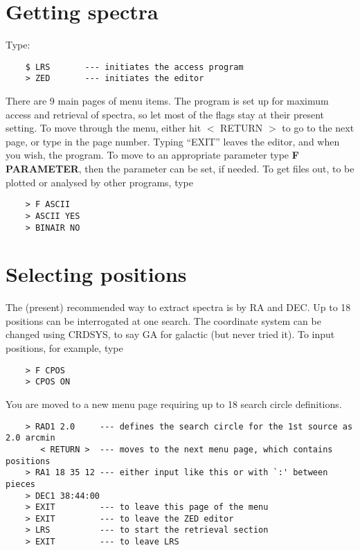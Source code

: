 \section{Getting spectra}

Type:
\begin{verbatim}
    $ LRS       --- initiates the access program
    > ZED       --- initiates the editor
\end{verbatim}
There are 9 main pages of menu items.
The program is set up for maximum access and retrieval of spectra, so let
most of the flags stay at their present setting.
To move through the menu, either hit $<$ RETURN $>$ to go to the next page,
or type in the page number.
Typing ``EXIT'' leaves the editor, and when you wish, the program.
To move to an appropriate parameter type {\bf F PARAMETER}, then the parameter
can be set, if needed.
To get files out, to be plotted or analysed by other programs, type
\begin{verbatim}
    > F ASCII
    > ASCII YES
    > BINAIR NO
\end{verbatim}

\section{Selecting positions}
The (present) recommended way to extract spectra is by RA and DEC.
Up to 18 positions can be interrogated at one search.
The coordinate system can be changed using CRDSYS, to say GA for galactic
(but never tried it).
To input positions, for example, type
\begin{verbatim}
    > F CPOS
    > CPOS ON
\end{verbatim}
You are moved to a new menu page requiring up to 18 search circle definitions. 

\begin{verbatim}
    > RAD1 2.0     --- defines the search circle for the 1st source as 2.0 arcmin
       < RETURN >  --- moves to the next menu page, which contains positions
    > RA1 18 35 12 --- either input like this or with `:' between pieces
    > DEC1 38:44:00 
    > EXIT         --- to leave this page of the menu
    > EXIT         --- to leave the ZED editor
    > LRS          --- to start the retrieval section
    > EXIT         --- to leave LRS
\end{verbatim}

